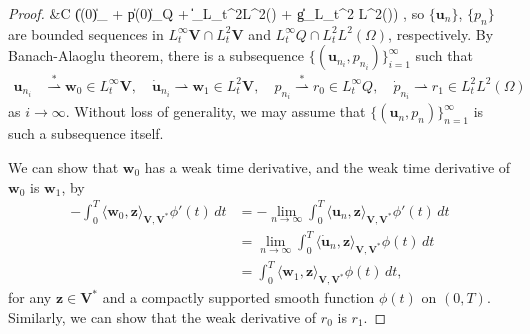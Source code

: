 \documentclass{amsart}
\newcommand{\algns}[1]{\begin{align*} #1 \end{align*}}
\newcommand{\LRp}[1]{\left( #1 \right)}
\begin{document}
\begin{proof}
{	\nonumber &\le C (\|(0)\|_{} + \|p(0)\|_{Q} + \|\|_{L_t^2L^2(\Omega)} + \|g\|_{L_t^2 L^2(\Omega)}) , 
}
%
so $\{ \boldsymbol{u}_n \}$, $\{p_n\}$ are bounded sequences in $L_t^{\infty} \boldsymbol{V} \cap L_t^{2} \boldsymbol{V}$ and $L_t^{\infty} Q \cap L_t^{2} L^2(\Omega)$, respectively. By Banach-Alaoglu theorem, there is a subsequence $\{\LRp{\boldsymbol{u}_{n_i}, p_{n_i}} \}_{i=1}^{\infty}$ such that
%
\algns{
	\boldsymbol{u}_{n_i} &\stackrel{*}{\rightharpoonup} \boldsymbol{w}_0 \in L_t^{\infty} \boldsymbol{V}, \quad \dot{\boldsymbol{u}}_{n_i} \rightharpoonup \boldsymbol{w}_1 \in L_t^2 \boldsymbol{V}, \quad p_{n_i} \stackrel{*}{\rightharpoonup} r_0 \in L_t^{\infty} Q, \quad \dot{p}_{n_i} \rightharpoonup r_1 \in L_t^2 L^2(\Omega)
}
%
as $i \to \infty$. Without loss of generality, we may assume that $\{(\boldsymbol{u}_n, p_n)\}_{n=1}^{\infty}$ is such a subsequence itself.

We can show that $\boldsymbol{w}_0$ has a weak time derivative, and the weak time derivative of $\boldsymbol{w}_0$ is $\boldsymbol{w}_1$, by 
%
\begin{align*}
    -\int_0^T \langle \boldsymbol{w}_0, \boldsymbol{z} \rangle_{\boldsymbol{V}, \boldsymbol{V}^*} \phi'(t)\,dt &= -\lim_{n \to \infty} \int_0^T \langle \boldsymbol{u}_n, \boldsymbol{z} \rangle_{\boldsymbol{V}, \boldsymbol{V}^*} \phi'(t)\,dt 
    \\
    &= \lim_{n \to \infty} \int_0^T \langle \dot{\boldsymbol{u}}_n, \boldsymbol{z} \rangle_{\boldsymbol{V}, \boldsymbol{V}^*} \phi(t)\,dt 
    \\
    &= \int_0^T \langle \boldsymbol{w}_1, \boldsymbol{z} \rangle_{\boldsymbol{V}, \boldsymbol{V}^*} \phi(t)\,dt ,
\end{align*}
%
for any $\boldsymbol{z} \in \boldsymbol{V}^*$ and a compactly supported smooth function $\phi(t)$ on $(0,T)$. Similarly, we can show that the weak derivative of $r_0$ is $r_1$. 


\end{proof}
\end{document}
